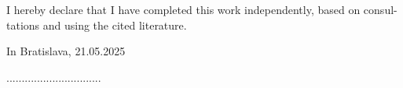 \thispagestyle{empty}
\vspace*{\fill}
I hereby declare that I have completed this work independently, based on consul-
tations and using the cited literature.
\begin{flushleft}
In Bratislava, 21.05.2025
    \begin{flushright}
        ...............................
    \end{flushright}
    \begin{flushright}

        \myName
    \end{flushright}
\end{flushleft}

\clearpage\null
\thispagestyle{empty}


